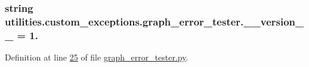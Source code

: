 \subsubsection[{\+\_\+\+\_\+version\+\_\+\+\_\+}]{\setlength{\rightskip}{0pt plus 5cm}string utilities.\+custom\+\_\+exceptions.\+graph\+\_\+error\+\_\+tester.\+\_\+\+\_\+version\+\_\+\+\_\+ = \textquotesingle{}1.\textquotesingle{}}\label{namespaceutilities_1_1custom__exceptions_1_1graph__error__tester_a0737f017d717d1aa08ae05d54ae5a491}


Definition at line \hyperlink{graph__error__tester_8py_source_l00025}{25} of file \hyperlink{graph__error__tester_8py_source}{graph\+\_\+error\+\_\+tester.\+py}.

